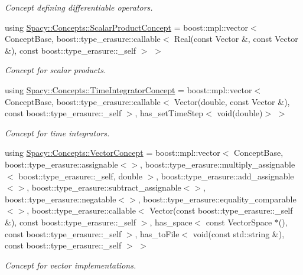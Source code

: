\begin{DoxyCompactItemize}
\begin{DoxyCompactList}\small\item\em Concept defining differentiable operators. \end{DoxyCompactList}\item 
using \hyperlink{group__ConceptGroup_ga1308724cda3078f228fb05c29556805d_ga1308724cda3078f228fb05c29556805d}{Spacy\+::\+Concepts\+::\+Scalar\+Product\+Concept} = boost\+::mpl\+::vector$<$ Concept\+Base, boost\+::type\+\_\+erasure\+::callable$<$ Real(const Vector \&, const Vector \&), const boost\+::type\+\_\+erasure\+::\+\_\+self $>$ $>$
\begin{DoxyCompactList}\small\item\em Concept for scalar products. \end{DoxyCompactList}\item 
using \hyperlink{group__ConceptGroup_ga45ecfe57ffb996aa97c9ff89a647f095_ga45ecfe57ffb996aa97c9ff89a647f095}{Spacy\+::\+Concepts\+::\+Time\+Integrator\+Concept} = boost\+::mpl\+::vector$<$ Concept\+Base, boost\+::type\+\_\+erasure\+::callable$<$ Vector(double, const Vector \&), const boost\+::type\+\_\+erasure\+::\+\_\+self $>$, has\+\_\+set\+Time\+Step$<$ void(double)$>$ $>$
\begin{DoxyCompactList}\small\item\em Concept for time integrators. \end{DoxyCompactList}\item 
using \hyperlink{group__ConceptGroup_gad6958389d1fa2758a8a64a0a24c36004_gad6958389d1fa2758a8a64a0a24c36004}{Spacy\+::\+Concepts\+::\+Vector\+Concept} = boost\+::mpl\+::vector$<$ Concept\+Base, boost\+::type\+\_\+erasure\+::assignable$<$$>$, boost\+::type\+\_\+erasure\+::multiply\+\_\+assignable$<$ boost\+::type\+\_\+erasure\+::\+\_\+self, double $>$, boost\+::type\+\_\+erasure\+::add\+\_\+assignable$<$$>$, boost\+::type\+\_\+erasure\+::subtract\+\_\+assignable$<$$>$, boost\+::type\+\_\+erasure\+::negatable$<$$>$, boost\+::type\+\_\+erasure\+::equality\+\_\+comparable$<$$>$, boost\+::type\+\_\+erasure\+::callable$<$ Vector(const boost\+::type\+\_\+erasure\+::\+\_\+self \&), const boost\+::type\+\_\+erasure\+::\+\_\+self $>$, has\+\_\+space$<$ const Vector\+Space $\ast$(), const boost\+::type\+\_\+erasure\+::\+\_\+self $>$, has\+\_\+to\+File$<$ void(const std\+::string \&), const boost\+::type\+\_\+erasure\+::\+\_\+self $>$ $>$
\begin{DoxyCompactList}\small\item\em Concept for vector implementations. \end{DoxyCompactList}\item 
$$
\end{DoxyCompactItemize}

